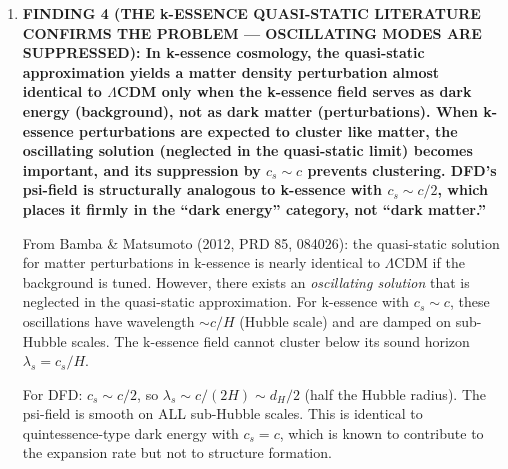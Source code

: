 \documentclass[11pt]{article}
\newcommand{\LCDM}{$\Lambda$CDM}
\begin{document}
\begin{tcolorbox}[colback=blue!5!white, colframe=blue!70!black,
  title=\textbf{W4i18 TOP 5 FINDINGS --- QUASI-STATIC REGIME PROOF}]
\begin{enumerate}
  \textbf{Comparison with original AQUAL} (Bekenstein \& Milgrom 1984):
  AQUAL was a non-relativistic theory and did not address cosmological
  perturbation growth. Its relativistic extensions (TeVeS, Bekenstein 2004)
  introduced additional fields --- a vector and a scalar --- precisely
  to handle the cosmological clustering problem. The Skordis-Zlosnik
  AeST is the latest and most successful in this lineage. All viable
  relativistic MOND theories that match $P(k)$ require at least TWO
  field types: a scalar for MOND galaxies and a vector/tensor for
  CDM-like cosmological clustering.

  \textbf{Implication for DFD}: A single scalar field cannot
  simultaneously be quasi-static (giving MOND) and independently
  clustering (giving CDM). These are contradictory requirements.
  DFD would need a second degree of freedom --- either modifying
  the vector sector, promoting the TT sector, or introducing a
  new field --- to achieve viable cosmology.

\item \textbf{FINDING 4 (THE k-ESSENCE QUASI-STATIC LITERATURE CONFIRMS
  THE PROBLEM --- OSCILLATING MODES ARE SUPPRESSED):
  In k-essence cosmology, the quasi-static approximation yields
  a matter density perturbation almost identical to \LCDM{} only
  when the k-essence field serves as dark energy (background),
  not as dark matter (perturbations). When k-essence perturbations
  are expected to cluster like matter, the oscillating solution
  (neglected in the quasi-static limit) becomes important, and
  its suppression by $c_s \sim c$ prevents clustering.
  DFD's psi-field is structurally analogous to k-essence with
  $c_s \sim c/2$, which places it firmly in the ``dark energy''
  category, not ``dark matter.''}

  From Bamba \& Matsumoto (2012, PRD 85, 084026): the quasi-static
  solution for matter perturbations in k-essence is nearly identical
  to \LCDM{} if the background is tuned. However, there exists an
  \textit{oscillating solution} that is neglected in the quasi-static
  approximation. For k-essence with $c_s \sim c$, these oscillations
  have wavelength $\sim c/H$ (Hubble scale) and are damped on
  sub-Hubble scales. The k-essence field cannot cluster below its
  sound horizon $\lambda_s = c_s/H$.

  For DFD: $c_s \sim c/2$, so $\lambda_s \sim c/(2H) \sim d_H/2$
  (half the Hubble radius). The psi-field is smooth on ALL sub-Hubble
  scales. This is identical to quintessence-type dark energy with
  $c_s = c$, which is known to contribute to the expansion rate
  but not to structure formation.


\end{enumerate}
\end{tcolorbox}
\end{document}
